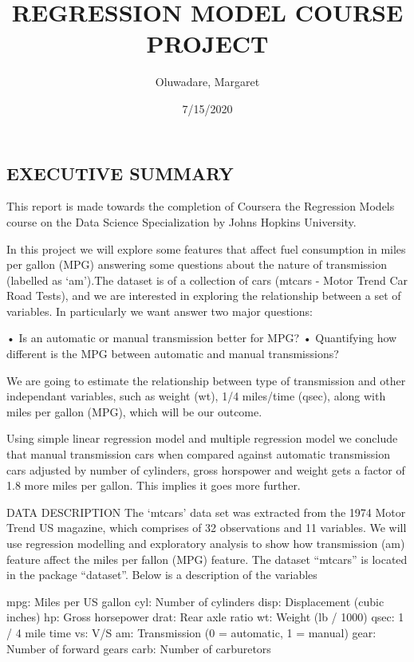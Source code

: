 \documentclass[
]{article}
\title{REGRESSION MODEL COURSE PROJECT}
\author{Oluwadare, Margaret}
\date{7/15/2020}
\begin{document}
\maketitle

{
\setcounter{tocdepth}{2}
\tableofcontents
}
\hypertarget{executive-summary}{%
\subsection{EXECUTIVE SUMMARY}\label{executive-summary}}

This report is made towards the completion of Coursera the Regression
Models course on the Data Science Specialization by Johns Hopkins
University.

In this project we will explore some features that affect fuel
consumption in miles per gallon (MPG) answering some questions about the
nature of transmission (labelled as `am').The dataset is of a collection
of cars (mtcars - Motor Trend Car Road Tests), and we are interested in
exploring the relationship between a set of variables. In particularly
we want answer two major questions:

• Is an automatic or manual transmission better for MPG? • Quantifying
how different is the MPG between automatic and manual transmissions?

We are going to estimate the relationship between type of transmission
and other independant variables, such as weight (wt), 1/4 miles/time
(qsec), along with miles per gallon (MPG), which will be our outcome.

Using simple linear regression model and multiple regression model we
conclude that manual transmission cars when compared against automatic
transmission cars adjusted by number of cylinders, gross horspower and
weight gets a factor of 1.8 more miles per gallon. This implies it goes
more further.

DATA DESCRIPTION The `mtcars' data set was extracted from the 1974 Motor
Trend US magazine, which comprises of 32 observations and 11 variables.
We will use regression modelling and exploratory analysis to show how
transmission (am) feature affect the miles per fallon (MPG) feature. The
dataset ``mtcars'' is located in the package ``dataset''. Below is a
description of the variables

mpg: Miles per US gallon cyl: Number of cylinders disp: Displacement
(cubic inches) hp: Gross horsepower drat: Rear axle ratio wt: Weight (lb
/ 1000) qsec: 1 / 4 mile time vs: V/S am: Transmission (0 = automatic, 1
= manual) gear: Number of forward gears carb: Number of carburetors
\end{document}
